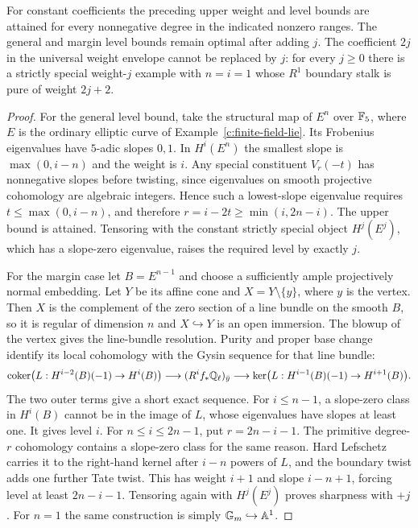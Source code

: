 \begin{proposition}
\label{c:level-optimality}
For constant coefficients the preceding upper weight and level bounds are attained for every nonnegative degree in the indicated nonzero ranges. The general and margin level bounds remain optimal after adding $j$. The coefficient $2j$ in the universal weight envelope cannot be replaced by $j$: for every $j\geq0$ there is a strictly special weight-$j$ example with $n=i=1$ whose $R^1$ boundary stalk is pure of weight $2j+2$.
\end{proposition}

\begin{proof}
For the general level bound, take the structural map of $E^n$ over $\mathbb F_5$, where $E$ is the ordinary elliptic curve of Example~\ref{c:finite-field-lie}. Its Frobenius eigenvalues have $5$-adic slopes $0,1$. In $H^i(E^n)$ the smallest slope is $\max(0,i-n)$ and the weight is $i$. Any special constituent $V_r(-t)$ has nonnegative slopes before twisting, since eigenvalues on smooth projective cohomology are algebraic integers. Hence such a lowest-slope eigenvalue requires $t\leq\max(0,i-n)$, and therefore $r=i-2t\geq\min(i,2n-i)$. The upper bound is attained. Tensoring with the constant strictly special object $H^j(E^j)$, which has a slope-zero eigenvalue, raises the required level by exactly $j$.

For the margin case let $B=E^{n-1}$ and choose a sufficiently ample projectively normal embedding. Let $Y$ be its affine cone and $X=Y\setminus\{y\}$, where $y$ is the vertex. Then $X$ is the complement of the zero section of a line bundle on the smooth $B$, so it is regular of dimension $n$ and $X\hookrightarrow Y$ is an open immersion. The blowup of the vertex gives the line-bundle resolution. Purity and proper base change identify its local cohomology with the Gysin sequence for that line bundle:
\[
 \operatorname{coker}\bigl(L:H^{i-2}(B)(-1)\to H^i(B)\bigr)
 \longrightarrow (R^if_*\mathbb Q_\ell)_{\bar y}
 \longrightarrow\ker\bigl(L:H^{i-1}(B)(-1)\to H^{i+1}(B)\bigr).
\]
The two outer terms give a short exact sequence. For $i\leq n-1$, a slope-zero class in $H^i(B)$ cannot be in the image of $L$, whose eigenvalues have slopes at least one. It gives level $i$. For $n\leq i\leq2n-1$, put $r=2n-i-1$. The primitive degree-$r$ cohomology contains a slope-zero class for the same reason. Hard Lefschetz carries it to the right-hand kernel after $i-n$ powers of $L$, and the boundary twist adds one further Tate twist. This has weight $i+1$ and slope $i-n+1$, forcing level at least $2n-i-1$. Tensoring again with $H^j(E^j)$ proves sharpness with $+j$. For $n=1$ the same construction is simply ${\mathbb G_m}\hookrightarrow\mathbb A^1$.


\end{proof}
